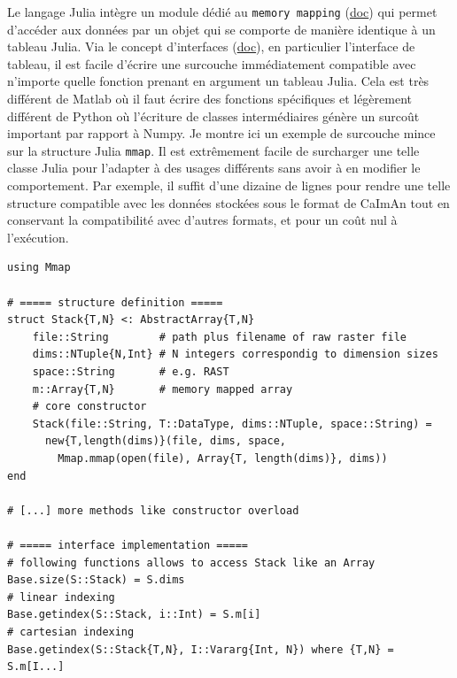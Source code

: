 Le langage Julia intègre un module dédié au \verb|memory mapping| (\href{https://docs.julialang.org/en/v1/stdlib/Mmap/index.html#Mmap.mmap}{doc}) qui permet d'accéder aux données par un objet qui se comporte de manière identique à un tableau Julia. Via le concept d'interfaces (\href{https://docs.julialang.org/en/v1/manual/interfaces/#man-interface-array-1}{doc}), en particulier l'interface de tableau, il est facile d'écrire une surcouche immédiatement compatible avec n'importe quelle fonction prenant en argument un tableau Julia. Cela est très différent de Matlab où il faut écrire des fonctions spécifiques et légèrement différent de Python où l'écriture de classes intermédiaires génère un surcoût important par rapport à Numpy. Je montre ici un exemple de surcouche mince sur la structure Julia \verb|mmap|.
Il est extrêmement facile de surcharger une telle classe Julia pour l'adapter à des usages différents sans avoir à en modifier le comportement. Par exemple, il suffit d'une dizaine de lignes pour rendre une telle structure compatible avec les données stockées sous le format de CaImAn tout en conservant la compatibilité avec d'autres formats, et pour un coût nul à l'exécution.

\juliastyle
\begin{lstlisting}
using Mmap

# ===== structure definition =====
struct Stack{T,N} <: AbstractArray{T,N}
    file::String        # path plus filename of raw raster file
    dims::NTuple{N,Int} # N integers correspondig to dimension sizes
    space::String       # e.g. RAST
    m::Array{T,N}       # memory mapped array
    # core constructor
    Stack(file::String, T::DataType, dims::NTuple, space::String) =
      new{T,length(dims)}(file, dims, space,
        Mmap.mmap(open(file), Array{T, length(dims)}, dims))
end

# [...] more methods like constructor overload

# ===== interface implementation =====
# following functions allows to access Stack like an Array
Base.size(S::Stack) = S.dims
# linear indexing
Base.getindex(S::Stack, i::Int) = S.m[i] 
# cartesian indexing
Base.getindex(S::Stack{T,N}, I::Vararg{Int, N}) where {T,N} = S.m[I...]
\end{lstlisting}



